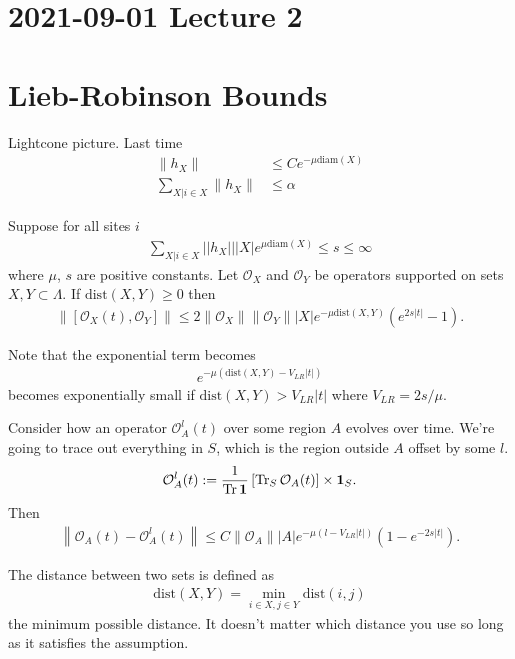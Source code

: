 \section{2021-09-01 Lecture 2}
\section{Lieb-Robinson Bounds}
Lightcone picture.
Last time
\begin{align}
    \| h_X \| &\le C e^{-\mu \mathrm{diam}(X)}\\
    \sum_{X| i\in X}\| h_X \| &\le \alpha
\end{align}
\begin{theorem}[Hastings]
    Suppose for all sites $i$
    \begin{align}
        \sum_{X | i\in X}
        || h_X ||
        |X|
        e^{\mu\mathrm{diam}(X)}
        \le s \le \infty
    \end{align}
    where $\mu$, $s$ are positive constants.
    Let $\mathcal{O}_X$ and $\mathcal{O}_Y$ be operators
    supported on sets $X,Y\subset\Lambda$.
    If $\mathrm{dist}(X, Y) \ge 0$
    then
    \begin{align}
        \|[\mathcal{O}_X(t), \mathcal{O}_Y]\|
        \le 2 \| \mathcal{O}_X \| \| \mathcal{O}_Y \| |X|
        e^{-\mu \mathrm{dist}(X, Y)}\left(
        e^{2s|t|} - 1
        \right).
    \end{align}
\end{theorem}
Note that the exponential term becomes
\begin{align}
    e^{-\mu(\mathrm{dist}(X, Y) - V_{LR}|t|)}
\end{align}
becomes exponentially small if $\mathrm{dist}(X, Y) > V_{LR}|t|$
where $V_{LR}=2s/\mu$.

Consider how an operator $\mathcal{O}_A^l(t)$ over some
region $A$ evolves over time.
We're going to trace out everything in $S$, which is the region outside $A$
offset by some $l$.
\begin{align}
    \mathcal{O}_A^l(t) := \frac{1}{\Tr \mathbf{1}}
    \left[
        \Tr_S \mathcal{O}_A(t)
    \right]\times \mathbf{1}_S.
\end{align}
Then
\begin{align}
    \left\|
        \mathcal{O}_A(t) - \mathcal{O}^l_A(t)
    \right\|
    \le
    C \|\mathcal{O}_A\| |A|
    e^{-\mu(l - V_{LR}|t|)}
    \left(
        1 - e^{-2s|t|}
    \right).
\end{align}

The distance between two sets is defined as
\begin{align}
    \mathrm{dist}(X, Y) = \min_{i\in X, j\in Y}
    \mathrm{dist}(i, j)
\end{align}
the minimum possible distance.
It doesn't matter which distance you use so long as it satisfies the assumption.

